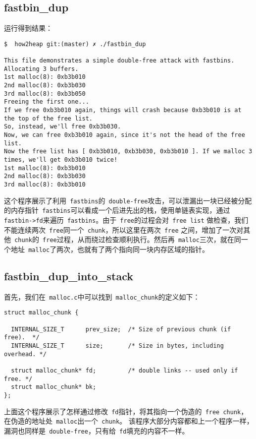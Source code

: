 \subsection{fastbin\_dup}

运行得到结果：
\begin{verbatim}
$  how2heap git:(master) ✗ ./fastbin_dup

This file demonstrates a simple double-free attack with fastbins.
Allocating 3 buffers.
1st malloc(8): 0xb3b010
2nd malloc(8): 0xb3b030
3rd malloc(8): 0xb3b050
Freeing the first one...
If we free 0xb3b010 again, things will crash because 0xb3b010 is at the top of the free list.
So, instead, we'll free 0xb3b030.
Now, we can free 0xb3b010 again, since it's not the head of the free list.
Now the free list has [ 0xb3b010, 0xb3b030, 0xb3b010 ]. If we malloc 3 times, we'll get 0xb3b010 twice!
1st malloc(8): 0xb3b010
2nd malloc(8): 0xb3b030
3rd malloc(8): 0xb3b010
\end{verbatim}

这个程序展示了利用\verb+ fastbins+的\verb+ double-free+攻击，可以泄漏出一块已经被分配的内存指针\verb+ fastbins+可以看成一个后进先出的栈，使用单链表实现，通过\verb+ fastbin->fd+来遍历\verb+ fastbins+。由于\verb+ free+的过程会对\verb+ free list+ 做检查，我们不能连续两次\verb+ free+同一个\verb+ chunk+，所以这里在两次\verb+ free+ 之间，增加了一次对其他\verb+ chunk+的\verb+ free+过程，从而绕过检查顺利执行。然后再\verb+ malloc+三次，就在同一个地址\verb+ malloc+了两次，也就有了两个指向同一块内存区域的指针。

\subsection{fastbin\_dup\_into\_stack}

首先，我们在\verb+ malloc.c+中可以找到\verb+ malloc_chunk+的定义如下：

\begin{verbatim}
struct malloc_chunk {

  INTERNAL_SIZE_T      prev_size;  /* Size of previous chunk (if free).  */
  INTERNAL_SIZE_T      size;       /* Size in bytes, including overhead. */

  struct malloc_chunk* fd;         /* double links -- used only if free. */
  struct malloc_chunk* bk;
};
\end{verbatim}

上面这个程序展示了怎样通过修改\verb+ fd+指针，将其指向一个伪造的\verb+ free chunk+，在伪造的地址处\verb+ malloc+出一个\verb+ chunk+。
该程序大部分内容都和上一个程序一样，漏洞也同样是\verb+ double-free+，只有给\verb+ fd+填充的内容不一样。

